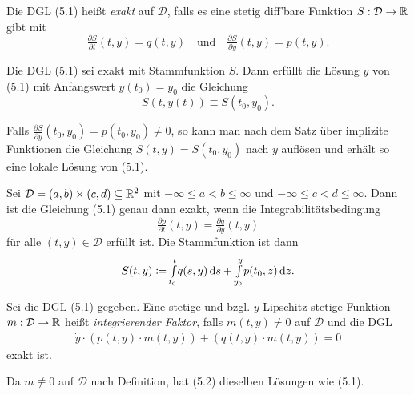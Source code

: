 \documentclass{cheat-sheet}
\newcommand{\D}{\mathcal{D}}
\begin{document}
\begin{defn}
  Die DGL (5.1) heißt \emph{exakt} auf $\D$, falls es eine stetig diff'bare Funktion $S : \D \to \R$ gibt mit
  \[
    \tfrac{\partial S}{\partial t}(t, y) = q(t, y)
    \quad \text{und} \quad
    \tfrac{\partial S}{\partial y}(t, y) = p(t, y).
  \]
\end{defn}

\begin{satz}
  Die DGL (5.1) sei exakt mit Stammfunktion $S$. Dann erfüllt die Lösung $y$ von (5.1) mit Anfangswert $y(t_0) = y_0$ die Gleichung
  \[ S(t, y(t)) \equiv S(t_0, y_0). \]
\end{satz}

\begin{bem}
  Falls $\tfrac{\partial S}{\partial y}(t_0, y_0) = p(t_0, y_0) \not= 0$, so kann man nach dem Satz über implizite Funktionen die Gleichung $S(t, y) = S(t_0, y_0)$ nach $y$ auflösen und erhält so eine lokale Lösung von (5.1).
\end{bem}



\begin{satz}
  Sei $\D = \ointerval{a}{b} \times \ointerval{c}{d} \subseteq \R^2$ mit $-\infty \leq a < b \leq \infty$ und $-\infty \leq c < d \leq \infty$. Dann ist die Gleichung (5.1) genau dann exakt, wenn die Integrabilitätsbedingung
  \[ \tfrac{\partial p}{\partial t}(t, y) = \tfrac{\partial q}{\partial y}(t, y) \]
  für alle $(t, y) \in \D$ erfüllt ist. Die Stammfunktion ist dann
  \[ S(t, y) \coloneqq {\textstyle \int\limits_{t_0}^{t}} q(s, y) \,\mathrm{d} s + {\textstyle \int\limits_{y_0}^{y}} p(t_0, z) \,\mathrm{d} z. \]
\end{satz}


\begin{defn}
  Sei die DGL (5.1) gegeben. Eine stetige und bzgl. $y$ Lipschitz-stetige Funktion $m : \D \to \R$ heißt \emph{integrierender Faktor}, falls $m(t, y) \not= 0$ auf $\D$ und die DGL
  \begin{align*}
    \dot{y} \cdot (p(t, y) \cdot m(t, y)) + (q(t, y) \cdot m(t, y)) = 0 \tag{5.2}
  \end{align*}
  exakt ist.
\end{defn}

\begin{bem}
  Da $m \not\equiv 0$ auf $\D$ nach Definition, hat (5.2) dieselben Lösungen wie (5.1).
\end{bem}

\end{document}
